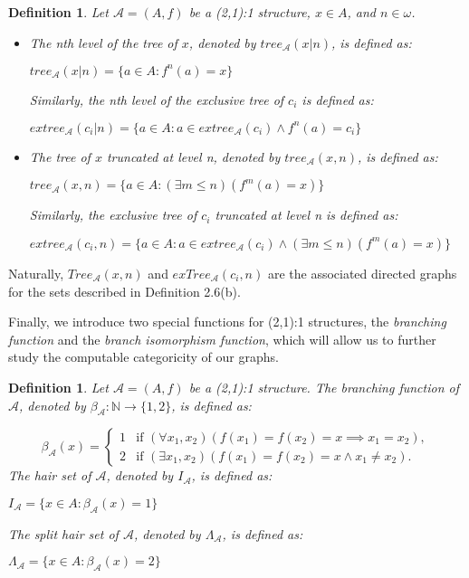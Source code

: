 \documentclass[12pt]{article}
\newtheorem{dfn}[thm]{Definition}
\begin{document}
\begin{dfn}
Let $\mathcal{A} = (A,f)$ be a (2,1):1 structure, $x \in A$, and $n \in \omega$.
\begin{itemize}
\item[(a)] The \emph{nth level of the tree of $x$}, denoted by $tree_{\mathcal{A}}(x|n)$, is defined as:
\begin{center}
$tree_{\mathcal{A}}(x|n) = \{a \in A: f^n(a)=x\}$
\end{center}
Similarly, the \emph{nth level of the exclusive tree of $c_i$} is defined as:
\begin{center}
$extree_{\mathcal{A}}(c_i|n) = \{a \in A: a \in extree_{\mathcal{A}}(c_i) \wedge f^n(a)=c_i\}$
\end{center}
\item[(b)] The \emph{tree of $x$ truncated at level n}, denoted by $tree_{\mathcal{A}}(x,n)$, is defined as:
\begin{center}
$tree_{\mathcal{A}}(x,n) = \{a \in A: (\exists m \leq n)(f^m(a)=x)\}$
\end{center}
Similarly, the \emph{exclusive tree of $c_i$ truncated at level n} is defined as:
\begin{center}
$extree_{\mathcal{A}}(c_i,n) = \{a \in A: a \in extree_{\mathcal{A}}(c_i) \wedge (\exists m \leq n)(f^m(a)=x)\}$
\end{center}
\end{itemize}
\end{dfn}

\noindent Naturally, $Tree_{\mathcal{A}}(x,n)$ and $exTree_{\mathcal{A}}(c_i,n)$ are the associated directed graphs for the sets described in Definition 2.6(b). 

Finally, we introduce two special functions for (2,1):1 structures, the \emph{branching function} and the \emph{branch isomorphism function}, which will allow us to further study the computable categoricity of our graphs.

\begin{dfn}
Let $\mathcal{A} = (A,f)$ be a \emph{(2,1):1} structure. The \emph{branching function of $\mathcal{A}$}, denoted by $\beta_{\mathcal{A}}: \mathbb{N} \to \{1,2\}$, is defined as:

$$\beta_{\mathcal{A}}(x)=
		\begin{cases}
			1 &\text{if } (\forall x_1, x_2)(f(x_1)=f(x_2)=x \implies x_1=x_2),\\
			2 &\text{if } (\exists x_1, x_2)(f(x_1)=f(x_2)=x \wedge x_1 \not= x_2).
		\end{cases}$$
The \emph{hair set of $\mathcal{A}$}, denoted by $I_\mathcal{A}$, is defined as:

\begin{center}
{$I_\mathcal{A} = \{x \in A: \beta_{\mathcal{A}}(x) = 1\}$}
\end{center}
The \emph{split hair set of $\mathcal{A}$}, denoted by $\Lambda_\mathcal{A}$, is defined as:

\begin{center}
$\Lambda_\mathcal{A} = \{x \in A: \beta_{\mathcal{A}}(x) = 2\}$
\end{center}
\end{dfn}
\end{document}

